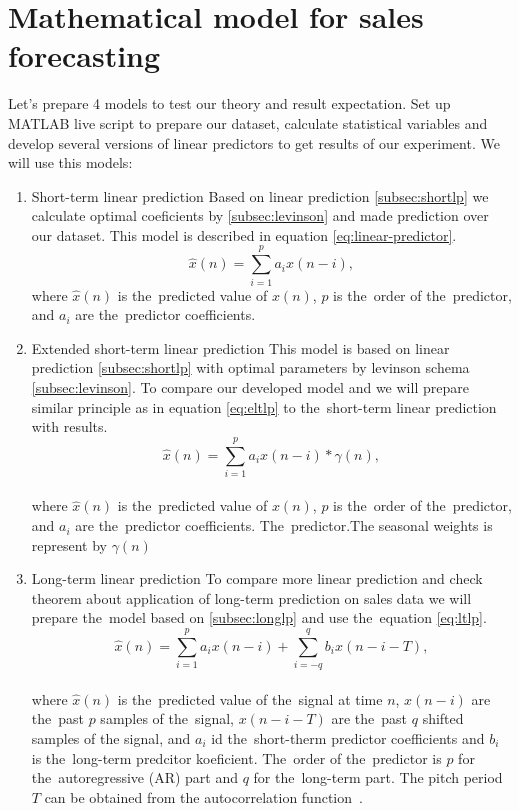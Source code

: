 \section{Mathematical model for sales forecasting}\label{subsec:calculate_models}
Let's prepare 4 models to test our theory and result expectation.  Set up MATLAB live script to prepare our dataset,
calculate statistical variables and develop several versions of linear predictors to get results of our experiment.
We will use this models:
\begin{enumerate}
    \item Short-term linear prediction 
    Based on linear prediction \ref{subsec:shortlp} we calculate optimal coeficients by \ref{subsec:levinson} and
    made prediction over our dataset. This model is described in equation \ref{eq:linear-predictor}.
    \begin{equation}
        \hat{x}(n) = \sum_{i=1}^{p} a_i x(n-i),
    \end{equation}
    where $\hat{x}(n)$ is the~predicted value of $x(n)$, $p$ is the~order of the~predictor, and $a_i$ are the~predictor coefficients.

    \item Extended short-term linear prediction 
    This model is based on linear prediction \ref{subsec:shortlp} with optimal parameters by levinson
    schema \ref{subsec:levinson}. To compare our developed model \label{subsec:extlonglp} and we will prepare
    similar principle as in equation \ref{eq:eltlp} to the~short-term linear prediction with results.
    \begin{equation} \label{eq:slp}
        \hat{x}(n) = \sum_{i=1}^{p} a_i x(n-i) * \gamma(n),
    \end{equation}
    \\
    where $\hat{x}(n)$ is the~predicted value of $x(n)$, $p$ is the~order of the~predictor, and $a_i$ are the~predictor coefficients. The~predictor.The seasonal weights is represent by $\gamma(n)$

    \item Long-term linear prediction 
    To compare more linear prediction and check theorem about application of long-term prediction on sales data
    we will prepare the~model based on \ref{subsec:longlp} and use the~equation \ref{eq:ltlp}.
    \begin{equation}
        \hat{x}(n) = \sum_{i=1}^{p} a_i x(n-i) + \sum_{i=-q}^{q} b_i x(n-i-T),
    \end{equation}
    \\
    where $\hat{x}(n)$ is the~predicted value of the~signal at time $n$, $x(n-i)$ are the~past $p$ samples of the~signal, $x(n-i-T)$ are the~past $q$ shifted samples of the signal, and $a_i$ id the~short-therm predictor coefficients and $b_i$ is the~long-term predcitor koeficient. The~order of the~predictor is $p$ for the~autoregressive (AR) part and $q$ for the~long-term part. The pitch period $T$ can be obtained from the autocorrelation function~\cite{vaseghi2008advanced}.\\


\end{enumerate}
